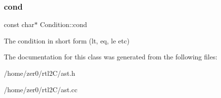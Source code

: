 \subsubsection{\texorpdfstring{cond}{cond}}
{\footnotesize\ttfamily const char$\ast$ Condition\+::cond\hspace{0.3cm}{\ttfamily [protected]}}

The condition in short form (lt, eq, le etc) 

The documentation for this class was generated from the following files\+:\begin{DoxyCompactItemize}
\item 
/home/zer0/rtl2\+C/ast.\+h\item 
/home/zer0/rtl2\+C/ast.\+cc\end{DoxyCompactItemize}

